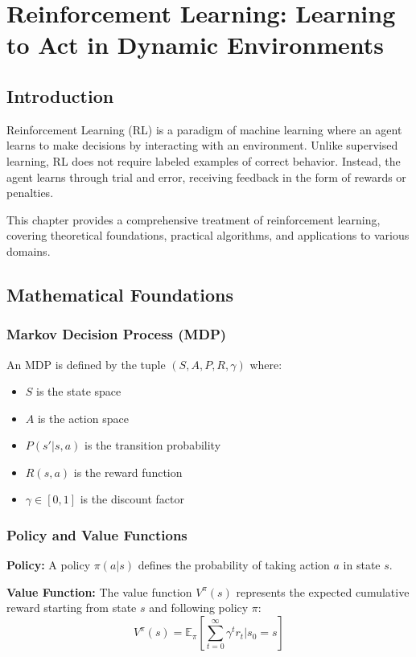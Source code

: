 \chapter{Reinforcement Learning: Learning to Act in Dynamic Environments}

\section{Introduction}

Reinforcement Learning (RL) is a paradigm of machine learning where an agent learns to make decisions by interacting with an environment. Unlike supervised learning, RL does not require labeled examples of correct behavior. Instead, the agent learns through trial and error, receiving feedback in the form of rewards or penalties.

This chapter provides a comprehensive treatment of reinforcement learning, covering theoretical foundations, practical algorithms, and applications to various domains.

\section{Mathematical Foundations}

\subsection{Markov Decision Process (MDP)}

An MDP is defined by the tuple $(S, A, P, R, \gamma)$ where:
\begin{itemize}
    \item $S$ is the state space
    \item $A$ is the action space
    \item $P(s'|s,a)$ is the transition probability
    \item $R(s,a)$ is the reward function
    \item $\gamma \in [0,1]$ is the discount factor
\end{itemize}

\subsection{Policy and Value Functions}

\textbf{Policy:} A policy $\pi(a|s)$ defines the probability of taking action $a$ in state $s$.

\textbf{Value Function:} The value function $V^\pi(s)$ represents the expected cumulative reward starting from state $s$ and following policy $\pi$:
\begin{equation}
    V^\pi(s) = \mathbb{E}_\pi\left[\sum_{t=0}^\infty \gamma^t r_t | s_0 = s\right]
\end{equation}

